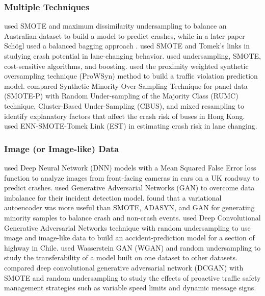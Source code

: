 \subsubsection{Multiple Techniques}
%
\cite{SCHLOGL2019134} used SMOTE and maximum dissimilarity undersampling to balance an Australian dataset to build a model to predict crashes, while in a later paper Sch\"{o}gl used a balanced bagging approach \citep{SCHLOGL2020105398}.    
%
\cite{CHEN2020102646} used SMOTE and Tomek's links in studying crash potential in lane-changing behavior.  
%
\cite{PENG2020105610} used undersampling, SMOTE, cost-sensitive algorithms, and boosting.  
%
\cite{LI2021106422} used the proximity weighted synthetic oversampling technique (ProWSyn) method to build a traffic violation prediction model.
%
\cite{CHEN2022106496} compared Synthetic Minority Over-Sampling Technique for panel data (SMOTE-P) with Random Under-sampling of the Majority Class (RUMC) technique, Cluster-Based Under-Sampling (CBUS), and mixed resampling to identify explanatory factors that affect the crash risk of buses in Hong Kong.
%
\cite{CHEN2020102646} used ENN-SMOTE-Tomek Link (EST) in estimating crash risk in lane changing.  



\subsubsection{Image (or Image-like) Data}
%
\cite{FORMOSA2020105429} used Deep Neural Network (DNN) models with a Mean Squared False Error loss function to analyze images from front-facing cameras in cars on a UK roadway to predict crashes.  
%
\cite{LIN2020105628} used Generative Adversarial Networks (GAN) to overcome data imbalance for their incident detection model.  
%
\cite{ISLAM2021105950} found that a variational autoencoder was more useful than SMOTE, ADASYN, and GAN for generating minority samples to balance crash and non-crash events.  
%
\cite{BASSO2021106409} used Deep Convolutional Generative Adversarial Networks technique with random undersampling to use image and image-like data to build an accident-prediction model for a section of highway in Chile.  
%
\cite{MAN2022106511} used Wasserstein GAN (WGAN) and random undersampling to study the transferability of a model built on one dataset to other datasets.  
%
\cite{CAI2020102697} compared deep convolutional generative adversarial network (DCGAN) with SMOTE and random undersampling to study the effects of proactive traffic safety management strategies such as variable speed limits and dynamic message signs.  

